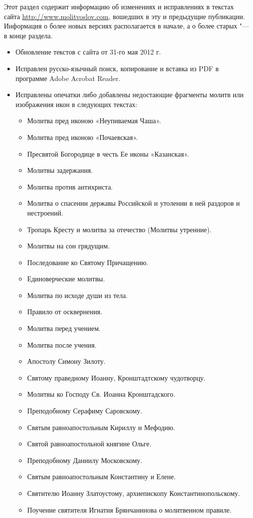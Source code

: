 \renewcommand{\ornament}{uzor_begin_9}

Этот раздел содержит информацию об изменениях и исправлениях в текстах сайта \url{http://www.molitvoslov.com}, вошедших в эту и предыдущие публикации. Информация о более новых версиях располагается в начале, а о более старых "--- в конце раздела.


{\small\begin{itemize}

\item Обновление текстов с сайта от 31-го мая 2012 г.
\item Исправлен русско-язычный поиск, копирование и вставка из PDF в программе Adobe Acrobat Reader.
\item Исправлены опечатки либо добавлены недостающие фрагменты молитв или изображения икон в следующих текстах:

\begin{itemize}
\item Молитва пред иконою «Неупиваемая Чаша».
\item Молитва пред иконою «Почаевская».
\item Пресвятой Богородице в честь Ее иконы «Казанская».
\item Молитвы задержания.
\item Молитва против антихриста.
\item Молитва о спасении державы Российской и утолении в ней раздоров и нестроений.
\item Тропарь Кресту и молитва за отечество (Молитвы утренние).
\item Молитвы на сон грядущим.
\item Последование ко Святому Причащению.
\item Единоверческие молитвы.
\item Молитва по исходе души из тела.
\item Правило от осквернения.
\item Молитва перед учением.
\item Молитва после учения.
\item Апостолу Симону Зилоту.
\item Святому праведному Иоанну, Кронштадтскому чудотворцу.
\item Молитвы ко Господу Св. Иоанна Кронштадского.
\item Преподобному Серафиму Саровскому.
\item Святым равноапостольным Кириллу и  Мефодию.
\item Святой равноапостольной княгине Ольге.
\item Преподобному Даниилу Московскому.
\item Святым равноапостольным Константину и Елене.
\item Святителю Иоанну Златоустому, архиепископу Константинопольскому.
\item Поучение святителя Игнатия Брянчанинова о молитвенном правиле.
\end{itemize}


\end{itemize}}
